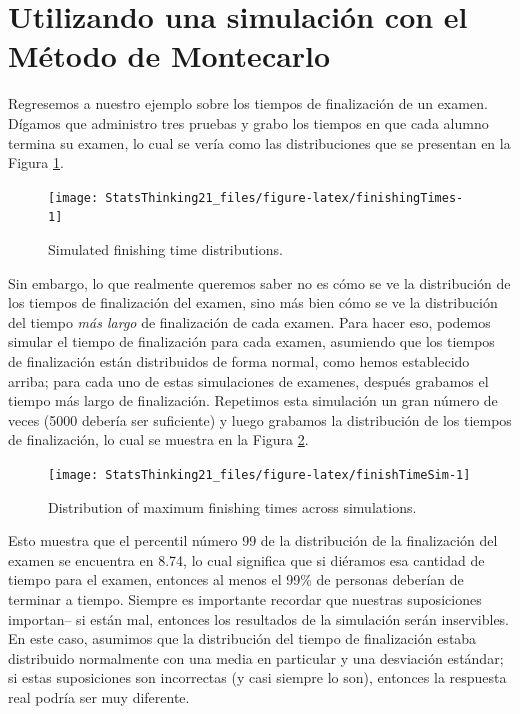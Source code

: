 \documentclass[
  12pt,
]{book}
\theoremstyle{definition}
\theoremstyle{definition}
\theoremstyle{definition}
\theoremstyle{remark}
\begin{document}
\hypertarget{utilizando-una-simulaciuxf3n-con-el-muxe9todo-de-montecarlo}{%
\section{Utilizando una simulación con el Método de Montecarlo}\label{utilizando-una-simulaciuxf3n-con-el-muxe9todo-de-montecarlo}}

Regresemos a nuestro ejemplo sobre los tiempos de finalización de un examen. Dígamos que administro tres pruebas y grabo los tiempos en que cada alumno termina su examen, lo cual se vería como las distribuciones que se presentan en la Figura \ref{fig:finishingTimes}.

\begin{figure}
\texttt{[image: StatsThinking21\_files/figure-latex/finishingTimes-1]} \caption{Simulated finishing time distributions.}\label{fig:finishingTimes}
\end{figure}

Sin embargo, lo que realmente queremos saber no es cómo se ve la distribución de los tiempos de finalización del examen, sino más bien cómo se ve la distribución del tiempo \emph{más largo} de finalización de cada examen. Para hacer eso, podemos simular el tiempo de finalización para cada examen, asumiendo que los tiempos de finalización están distribuidos de forma normal, como hemos establecido arriba; para cada uno de estas simulaciones de examenes, después grabamos el tiempo más largo de finalización. Repetimos esta simulación un gran número de veces (5000 debería ser suficiente) y luego grabamos la distribución de los tiempos de finalización, lo cual se muestra en la Figura \ref{fig:finishTimeSim}.

\begin{figure}
\texttt{[image: StatsThinking21\_files/figure-latex/finishTimeSim-1]} \caption{Distribution of maximum finishing times across simulations.}\label{fig:finishTimeSim}
\end{figure}

Esto muestra que el percentil número 99 de la distribución de la finalización del examen se encuentra en 8.74, lo cual significa que si diéramos esa cantidad de tiempo para el examen, entonces al menos el 99\% de personas deberían de terminar a tiempo. Siempre es importante recordar que nuestras suposiciones importan-- si están mal, entonces los resultados de la simulación serán inservibles. En este caso, asumimos que la distribución del tiempo de finalización estaba distribuido normalmente con una media en particular y una desviación estándar; si estas suposiciones son incorrectas (y casi siempre lo son), entonces la respuesta real podría ser muy diferente.
\end{document}
